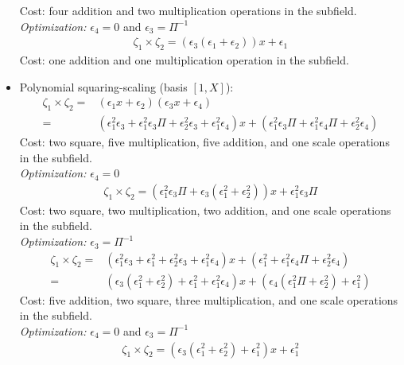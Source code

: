 \begin{itemize}
	Cost: four addition and two multiplication operations in the subfield. \\
	\emph{Optimization:} $\epsilon_4 = 0$ and $\epsilon_3 = \Pi^{-1}$
	\begin{align*}
	\zeta_1 \times \zeta_2 = (\epsilon_3(\epsilon_1 + \epsilon_2))x + \epsilon_1
	\end{align*}
	Cost: one addition and one multiplication operation in the subfield.
	\item Polynomial squaring-scaling (basis $[1, X]$): 
	\begin{align*}
	\zeta_1 \times \zeta_2 = & (\epsilon_1 x + \epsilon_2)(\epsilon_3 x + \epsilon_4)\\
	= & (\epsilon_1^2\epsilon_3 +\epsilon_1^2\epsilon_3\Pi + \epsilon_2^2\epsilon_3 + \epsilon_1^2\epsilon_4) x + (\epsilon_1^2\epsilon_3\Pi + \epsilon_1^2\epsilon_4\Pi + \epsilon_2^2\epsilon_4) 
	\end{align*}
	Cost: two square, five multiplication, five addition, and one scale operations in the subfield. \\
	\emph{Optimization:} $\epsilon_4 = 0$
	\begin{align*}
	\zeta_1 \times \zeta_2 = (\epsilon_1^2\epsilon_3\Pi + \epsilon_3(\epsilon_1^2 + \epsilon_2^2))x + \epsilon_1^2\epsilon_3\Pi
	\end{align*}
	Cost: two square, two multiplication, two addition, and one scale operations in the subfield. \\
	\emph{Optimization:} $\epsilon_3 = \Pi^{-1}$
	\begin{align*}
	\zeta_1 \times \zeta_2 = & (\epsilon_1^2\epsilon_3 +\epsilon_1^2 + \epsilon_2^2\epsilon_3 + \epsilon_1^2\epsilon_4) x + (\epsilon_1^2 + \epsilon_1^2\epsilon_4\Pi + \epsilon_2^2\epsilon_4) \\
	= & (\epsilon_3(\epsilon_1^2 + \epsilon_2^2) + \epsilon_1^2 + \epsilon_1^2\epsilon_4) x + (\epsilon_4(\epsilon_1^2\Pi + \epsilon_2^2) + \epsilon_1^2)
	\end{align*}
	Cost: five addition, two square, three multiplication, and one scale operations in the subfield. \\
	\emph{Optimization:} $\epsilon_4 = 0$ and $\epsilon_3 = \Pi^{-1}$
	\begin{align*}
	\zeta_1 \times \zeta_2 = (\epsilon_3(\epsilon_1^2 + \epsilon_2^2) + \epsilon_1^2)x + \epsilon_1^2

\end{align*}
\end{itemize}
